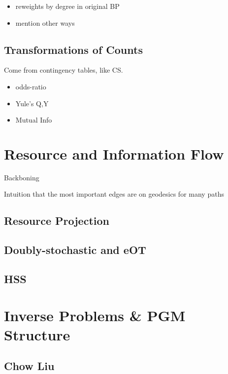 \documentclass[%
	12pt,
		oneside,
		letterpaper
]{book}
\providecommand{\tightlist}{%
  \setlength{\itemsep}{0pt}\setlength{\parskip}{0pt}}\usepackage{longtable,booktabs,array}
\begin{document}
\begin{itemize}
\tightlist
\item
  reweights by degree in original BP
\item
  mention other ways
\end{itemize}

\subsection{Transformations of Counts}\label{transformations-of-counts}

Come from contingency tables, like CS.

\begin{itemize}
\tightlist
\item
  odds-ratio
\item
  Yule's Q,Y
\item
  Mutual Info
\end{itemize}

\section{Resource and Information
Flow}\label{resource-and-information-flow}

Backboning

Intuition that the most important edges are on geodesics for many paths

\subsection{Resource Projection}\label{resource-projection}

\subsection{Doubly-stochastic and eOT}\label{doubly-stochastic-and-eot}

\subsection{HSS}\label{hss}

\section{Inverse Problems \& PGM
Structure}\label{inverse-problems-pgm-structure}

\subsection{Chow Liu}\label{chow-liu}
\end{document}
